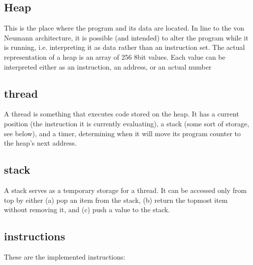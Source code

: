 \documentclass[letterpaper, 12pt]{article}
\begin{document}
\subsection{Heap} %
\label{sub:heap}
This is the place where the program and its data are located. In line to the von Neumann architecture, it is possible (and intended) to alter the program while it is running, i.e. interpreting it as data rather than an instruction set. The actual representation of a heap is an array of 256 8bit values. Each value can be interpreted either as an instruction, an address, or an actual number

\subsection{thread} %
\label{sub:thread}
A thread is something that executes code stored on the heap. It has a current position (the instruction it is currently evaluating), a stack (some sort of storage, see below), and a timer, determining when it will move its program counter to the heap's next address.

\subsection{stack} %
\label{sub:stack}
A stack serves as a temporary storage for a thread. It can be accessed only from top by either (a) pop an item from the stack, (b) return the topmost item without removing it, and (c) push a value to the stack.


\subsection{instructions} %
\label{sub:instructions}


These are the implemented instructions:
\end{document}
